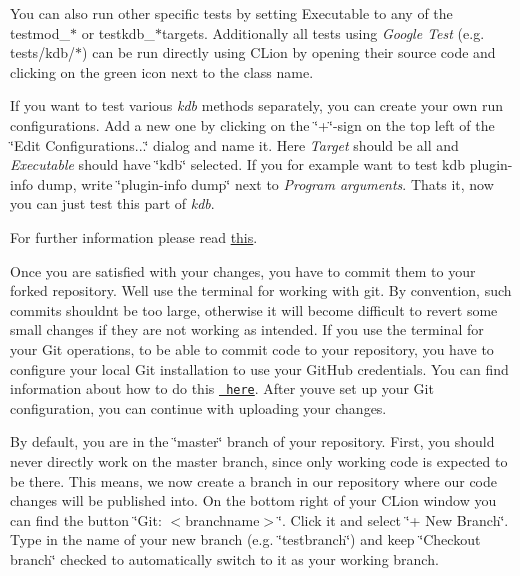 You can also run other specific tests by setting {\ttfamily Executable} to any of the {\ttfamily testmod\+\_\+$\ast$} or {\ttfamily testkdb\+\_\+$\ast$}targets. Additionally all tests using {\itshape Google Test} (e.\+g. tests/kdb/$\ast$) can be run directly using C\+Lion by opening their source code and clicking on the green icon next to the class name.

If you want to test various {\itshape kdb} methods separately, you can create your own run configurations. Add a new one by clicking on the \char`\"{}+\char`\"{}-\/sign on the top left of the \char`\"{}\+Edit Configurations...\char`\"{} dialog and name it. Here {\itshape Target} should be {\ttfamily all} and {\itshape Executable} should have \char`\"{}kdb\char`\"{} selected. If you for example want to test {\ttfamily kdb plugin-\/info dump}, write \char`\"{}plugin-\/info dump\char`\"{} next to {\itshape Program arguments}. That\textquotesingle{}s it, now you can just test this part of {\itshape kdb}.

For further information please read \mbox{\hyperlink{doc_TESTING_md}{this}}.

Once you are satisfied with your changes, you have to commit them to your forked repository. We\textquotesingle{}ll use the terminal for working with git. By convention, such commits shouldn\textquotesingle{}t be too large, otherwise it will become difficult to revert some small changes if they are not working as intended. If you use the terminal for your Git operations, to be able to commit code to your repository, you have to configure your local Git installation to use your Git\+Hub credentials. You can find information about how to do this \href{https://help.github.com/en/articles/set-up-git}{\texttt{ here}}. After you\textquotesingle{}ve set up your Git configuration, you can continue with uploading your changes.

By default, you are in the \char`\"{}master\char`\"{} branch of your repository. First, you should never directly work on the master branch, since only working code is expected to be there. This means, we now create a branch in our repository where our code changes will be published into. On the bottom right of your C\+Lion window you can find the button \char`\"{}\+Git\+: $<$branchname$>$\char`\"{}. Click it and select \char`\"{}+ New Branch\char`\"{}. Type in the name of your new branch (e.\+g. \char`\"{}testbranch\char`\"{}) and keep \char`\"{}\+Checkout branch\char`\"{} checked to automatically switch to it as your working branch.

